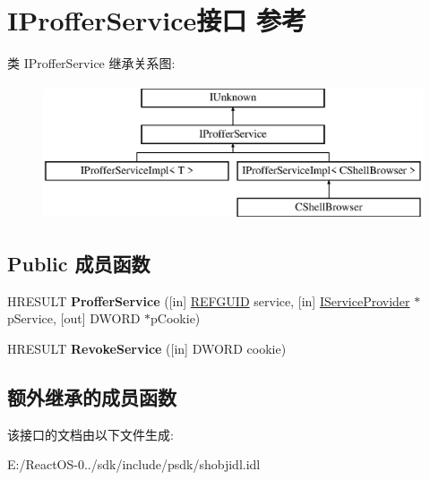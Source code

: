 \hypertarget{interface_i_proffer_service}{}\section{I\+Proffer\+Service接口 参考}
\label{interface_i_proffer_service}
类 I\+Proffer\+Service 继承关系图\+:\begin{figure}[H]
\begin{center}
\leavevmode
\includegraphics[height=4.000000cm]{interface_i_proffer_service}
\end{center}
\end{figure}
\subsection*{Public 成员函数}
\begin{DoxyCompactItemize}
\item 
\mbox{\label{interface_i_proffer_service_abf254a4097debe5ef2568fc762bb3939}} 
H\+R\+E\+S\+U\+LT {\bfseries Proffer\+Service} (\mbox{[}in\mbox{]} \hyperlink{struct___g_u_i_d}{R\+E\+F\+G\+U\+ID} service, \mbox{[}in\mbox{]} \hyperlink{interface_i_service_provider}{I\+Service\+Provider} $\ast$p\+Service, \mbox{[}out\mbox{]} D\+W\+O\+RD $\ast$p\+Cookie)
\item 
\mbox{\label{interface_i_proffer_service_ac5a80f83d6f137253fb99c3a5a33ccf4}} 
H\+R\+E\+S\+U\+LT {\bfseries Revoke\+Service} (\mbox{[}in\mbox{]} D\+W\+O\+RD cookie)
\end{DoxyCompactItemize}
\subsection*{额外继承的成员函数}


该接口的文档由以下文件生成\+:\begin{DoxyCompactItemize}
\item 
E\+:/\+React\+O\+S-\/0../sdk/include/psdk/shobjidl.\+idl\end{DoxyCompactItemize}
